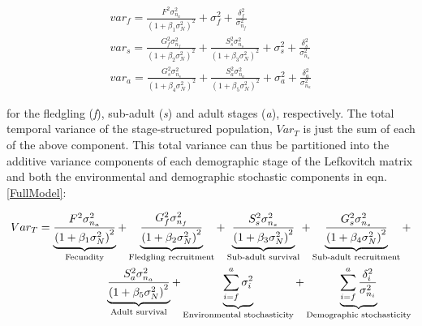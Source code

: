 \documentclass[12pt,a4paper]{article}
\begin{document}
\begin{equation}\label{VarCompSingle}
	\begin{array}{l}
		{var_{f} = \frac{F^{2}\sigma^2_{n_{a}}}{\left(1 + \beta_{1}\sigma^2_{N}\right)^2} + \sigma_{f}^{2}+\frac{\delta_{f}^{2}}{\sigma^2_{n_{f}}}} \\
		
		{var_{s} = \frac{G_{f}^{2}\sigma^2_{n_{f}}}{\left(1 + \beta_{2}\sigma^2_{N}\right)^2} + \frac{S_{s}^{2}\sigma^2_{n_{s}}}{\left(1 + \beta_{3}\sigma^2_{N}\right)^2} + \sigma_{s}^{2}+\frac{\delta_{s}^{2}}{\sigma^2_{n_{s}}}} \\
		
		{var_{a} = \frac{G_{s}^{2}\sigma^2_{n_{s}}}{\left(1 + \beta_{4}\sigma^2_{N}\right)^2} + \frac{S_{a}^{2}\sigma^2_{n_{a}}}{\left(1 + \beta_{5}\sigma^2_{N}\right)^2} + \sigma_{a}^{2} + \frac{\delta_{a}^{2}}{\sigma^2_{n_{a}}}}
	\end{array}
\end{equation}

for the fledgling (\textit{f}), sub-adult (\textit{s}) and adult stages (\textit{a}), respectively. The total temporal variance of the stage-structured population, $Var_{T}$ is just the sum of each of the above component. This total variance can thus be partitioned into the additive variance components of each demographic stage of the Lefkovitch matrix and both the environmental and demographic stochastic components in eqn. \ref{FullModel}:

\begin{align}\label{VarCompFull}
	Var_{T}=
	\underbrace{\frac{F^{2}\sigma^2_{n_{a}}}{\left(1 + \beta_{1}\sigma^2_{N}\right)^2}}_{\text{Fecundity}} +
	\underbrace{\frac{G_{f}^{2}\sigma^2_{n_{f}}}{\left(1 + \beta_{2}\sigma^2_{N}\right)^2}}_{\text{Fledgling recruitment}} +
	\underbrace{\frac{S_{s}^{2}\sigma^2_{n_{s}}}{\left(1 + \beta_{3}\sigma^2_{N}\right)^2}}_{\text{Sub-adult survival}} +
	\underbrace{\frac{G_{s}^{2}\sigma^2_{n_{s}}}{\left(1 + \beta_{4}\sigma^2_{N}\right)^2}}_{\text{Sub-adult recruitment}} +
	\notag\\
	\underbrace{\frac{S_{a}^{2}\sigma^2_{n_{a}}}{\left(1 + \beta_{5}\sigma^2_{N}\right)^2}}_{\text{Adult survival}} +
	\underbrace{\sum_{i=f}^{a} \sigma_{i}^{2}}_{\text{Environmental stochasticity}} +
	\underbrace{\sum_{i=f}^{a} \frac{\delta_{i}^{2}}{\sigma^2_{n_{i}}}}_{\text{Demographic stochasticity}}
\end{align}

\vspace{0.2in}
\end{document}
